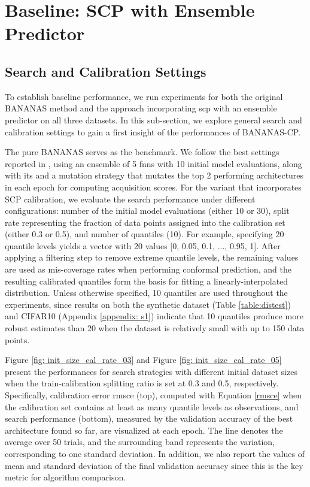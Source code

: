\documentclass[a4paper,oneside,bibliography=totoc]{scrbook}
\begin{document}
\section{Baseline: SCP with Ensemble Predictor}
\label{sec: baseline}

\subsection{Search and Calibration Settings}
\label{sec: sc_setting}
To establish baseline performance, we run experiments for both the original BANANAS method and the approach incorporating \gls{scp} with an ensemble predictor on all three datasets. In this sub-section, we explore general search and calibration settings to gain a first insight of the performances of BANANAS-CP.

The pure BANANAS serves as the benchmark. We follow the best settings reported in \cite{white2019bananas}, using an ensemble of 5 \gls{fnns} with 10 initial model evaluations, along with \gls{its} and a mutation strategy that mutates the top 2 performing architectures in each epoch for computing acquisition scores. For the variant that incorporates SCP calibration, we evaluate the search performance under different configurations: number of the initial model evaluations (either 10 or 30), split rate representing the fraction of data points assigned into the calibration set (either 0.3 or 0.5), and number of quantiles (10). For example, specifying 20 quantile levels yields a vector with 20 values [0, 0.05, 0.1, ..., 0.95, 1]. After applying a filtering step to remove extreme quantile levels, the remaining values are used as mis-coverage rates when performing conformal prediction, and the resulting calibrated quantiles form the basis for fitting a linearly-interpolated distribution. Unless otherwise specified, 10 quantiles are used throughout the experiments, since results on both the synthetic dataset (Table \ref{table:distest}) and CIFAR10 (Appendix \ref{appendix: s1}) indicate that 10 quantiles produce more robust estimates than 20 when the dataset is relatively small with up to 150 data points.

Figure \ref{fig: init_size_cal_rate_03} and Figure \ref{fig: init_size_cal_rate_05} present the performances for search strategies with different initial dataset sizes when the train-calibration splitting ratio is set at 0.3 and 0.5, respectively. Specifically, calibration error \gls{rmsce} (top), computed with Equation \ref{rmsce} when the calibration set contains at least as many quantile levels as observations, and search performance (bottom), measured by the validation accuracy of the best architecture found so far, are visualized at each epoch. The line denotes the average over 50 trials, and the surrounding band represents the variation, corresponding to one standard deviation. In addition, we also report the values of mean and standard deviation of the final validation accuracy since this is the key metric for algorithm comparison.
\end{document}
